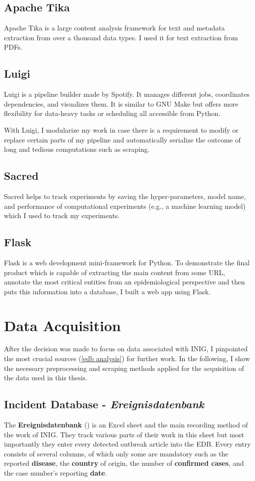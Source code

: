\subsection{Apache Tika}\label{Tika}
Apache Tika is a large content analysis framework for text and metadata extraction from over a thousand data types. I used it for text extraction from PDFs.

\subsection{Luigi}
Luigi is a pipeline builder made by Spotify. It manages different jobs, coordinates dependencies, and visualizes them. It is similar to GNU Make but offers more flexibility for data-heavy tasks or scheduling all accessible from Python.

With Luigi, I modularize my work in case there is a requirement to modify or replace certain parts of my pipeline and automatically serialize the outcome of long and tedious computations such as scraping.

\subsection{Sacred}
Sacred helps to track experiments by saving the hyper-parameters, model name, and performance of computational experiments (e.g., a machine learning model)
which I used to track my experiments.

\subsection{Flask}
Flask is a web development mini-framework for Python.
To demonstrate the final product which is capable of extracting the main content from some URL, annotate the most critical entities from an epidemiological perspective and then puts this information into a database, I built a web app using Flask.

\section{Data Acquisition}
After the decision was made to focus on data associated with INIG, I pinpointed the most crucial sources (\ref{edb analysis}) for further work. In the following, I show the necessary preprocessing and scraping methods applied for the acquisition of the data used in this thesis.

\subsection{Incident Database - \textit{Ereignisdatenbank}}
The \textbf{Ereignisdatenbank} () is an Excel sheet and the main recording method of the work of INIG. They track various parts of their work in this sheet but most importantly they enter every detected outbreak article into the EDB. Every entry consists of several columns, of which only some are mandatory such as the reported \textbf{disease}, the \textbf{country} of origin, the number of \textbf{confirmed cases}, and the case number's reporting \textbf{date}.

